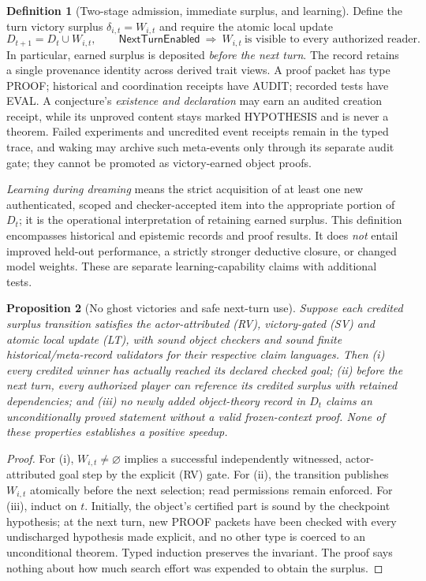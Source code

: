 \documentclass[11pt,letterpaper]{article}
\theoremstyle{definition}
\newtheorem{definition}{Definition}[section]
\theoremstyle{plain}
\newtheorem{proposition}[definition]{Proposition}
\theoremstyle{definition}
\begin{document}
\begin{definition}[Two-stage admission, immediate surplus, and learning]
Define the turn victory surplus $\delta_{i,t}=W_{i,t}$ and require the atomic local update
\[
 D_{t+1}=D_t\cup W_{i,t},\qquad
 \mathsf{NextTurnEnabled}\ \Longrightarrow\ W_{i,t}\ \text{is visible to every authorized reader}.\tag{LT}
\]
In particular, earned surplus is deposited \emph{before the next turn}. The record retains a single provenance identity across derived trait views. A proof packet has type \textsf{PROOF}; historical and coordination receipts have \textsf{AUDIT}; recorded tests have \textsf{EVAL}. A conjecture's \emph{existence and declaration} may earn an audited creation receipt, while its unproved content stays marked \textsf{HYPOTHESIS} and is never a theorem. Failed experiments and uncredited event receipts remain in the typed trace, and waking may archive such meta-events only through its separate audit gate; they cannot be promoted as victory-earned object proofs.

\emph{Learning during dreaming} means the strict acquisition of at least one new authenticated, scoped and checker-accepted item into the appropriate portion of $D_t$; it is the operational interpretation of retaining earned surplus. This definition encompasses historical and epistemic records and proof results. It does \emph{not} entail improved held-out performance, a strictly stronger deductive closure, or changed model weights. These are separate learning-capability claims with additional tests.
\end{definition}

\begin{proposition}[No ghost victories and safe next-turn use]
Suppose each credited surplus transition satisfies the actor-attributed (RV), victory-gated (SV) and atomic local update (LT), with sound object checkers and sound finite historical/meta-record validators for their respective claim languages. Then (i) every credited winner has actually reached its declared checked goal; (ii) before the next turn, every authorized player can reference its credited surplus with retained dependencies; and (iii) no newly added object-theory record in $D_t$ claims an unconditionally proved statement without a valid frozen-context proof. None of these properties establishes a positive speedup.
\end{proposition}
\begin{proof}
For (i), $W_{i,t}\ne\varnothing$ implies a successful independently witnessed, actor-attributed goal step by the explicit (RV) gate. For (ii), the transition publishes $W_{i,t}$ atomically before the next selection; read permissions remain enforced. For (iii), induct on $t$. Initially, the object's certified part is sound by the checkpoint hypothesis; at the next turn, new \textsf{PROOF} packets have been checked with every undischarged hypothesis made explicit, and no other type is coerced to an unconditional theorem. Typed induction preserves the invariant. The proof says nothing about how much search effort was expended to obtain the surplus.
\end{proof}
\end{document}
